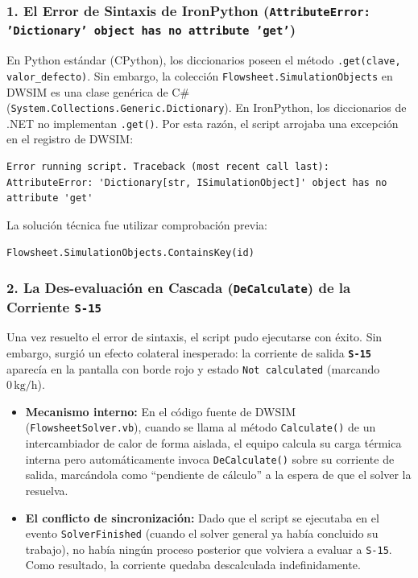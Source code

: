 \documentclass[11pt,a4paper]{article}
\begin{document}
\subsubsection{1. El Error de Sintaxis de IronPython (\texttt{AttributeError: 'Dictionary' object has no attribute 'get'})}
En Python estándar (CPython), los diccionarios poseen el método \texttt{.get(clave, valor\_defecto)}. Sin embargo, la colección \texttt{Flowsheet.SimulationObjects} en DWSIM es una clase genérica de C\# (\texttt{System.Collections.Generic.Dictionary}). 
En IronPython, los diccionarios de .NET no implementan \texttt{.get()}. Por esta razón, el script arrojaba una excepción en el registro de DWSIM:
\begin{verbatim}
Error running script. Traceback (most recent call last):
AttributeError: 'Dictionary[str, ISimulationObject]' object has no attribute 'get'
\end{verbatim}
La solución técnica fue utilizar comprobación previa:
\begin{center}
\texttt{Flowsheet.SimulationObjects.ContainsKey(id)}
\end{center}

\subsubsection{2. La Des-evaluación en Cascada (\texttt{DeCalculate}) de la Corriente \texttt{S-15}}
Una vez resuelto el error de sintaxis, el script pudo ejecutarse con éxito. Sin embargo, surgió un efecto colateral inesperado: la corriente de salida \textbf{\texttt{S-15}} aparecía en la pantalla con borde rojo y estado \texttt{Not calculated} (marcando $0\,\text{kg/h}$).
\begin{itemize}
    \item \textbf{Mecanismo interno:} En el código fuente de DWSIM (\texttt{FlowsheetSolver.vb}), cuando se llama al método \texttt{Calculate()} de un intercambiador de calor de forma aislada, el equipo calcula su carga térmica interna pero automáticamente invoca \texttt{DeCalculate()} sobre su corriente de salida, marcándola como ``pendiente de cálculo'' a la espera de que el solver la resuelva.
    \item \textbf{El conflicto de sincronización:} Dado que el script se ejecutaba en el evento \texttt{SolverFinished} (cuando el solver general ya había concluido su trabajo), no había ningún proceso posterior que volviera a evaluar a \texttt{S-15}. Como resultado, la corriente quedaba descalculada indefinidamente.
\end{itemize}
\end{document}
